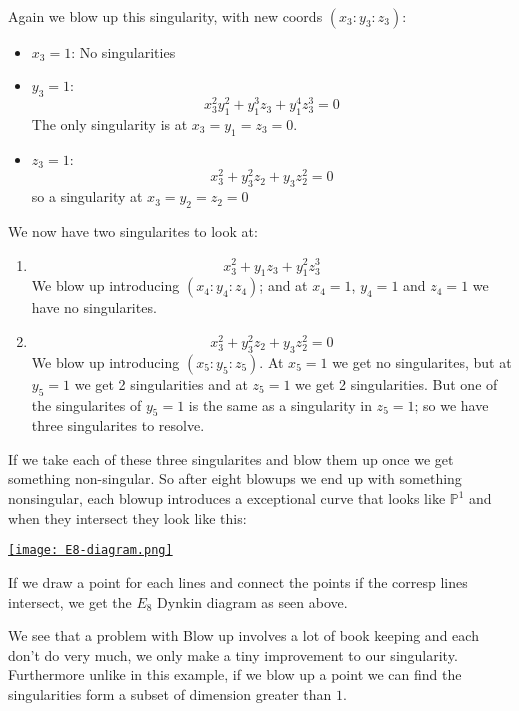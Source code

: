     \

    Again we blow up this singularity, with new coords $(x_3\colon y_3\colon z_3)$:\begin{itemize}
        \item $x_3=1$: No singularities
        \item $y_3=1$: \[x_3^2y_1^2+y_1^3z_3+y_1^4z_3^3 = 0\] The only singularity is at $x_3=y_1=z_3=0$.
        \item $z_3=1$: \[x_3^2+y_3^2z_2+y_3z_2^2 = 0\] so a singularity at $x_3=y_2=z_2=0$
    \end{itemize}
We now have two singularites to look at:\begin{enumerate}[label = (\arabic*)]
    \item \[x_3^2+y_1z_3+y_1^2z_3^3\] We blow up introducing $(x_4\colon y_4\colon z_4)$; and at $x_4 =1$, $y_4=1$ and $z_4=1$ we have no singularites.
    \item \[x_3^2+y_3^2z_2+y_3z_2^2 = 0\]We blow up introducing $(x_5\colon y_5\colon z_5)$. At $x_5=1$ we get no singularites, but at $y_5=1$ we get 2 singularities and at $z_5 = 1$ we get 2 singularities. But one of the singularites of $y_5=1$ is the same as a singularity in $z_5=1$; so we have three singularites to resolve.
\end{enumerate}

If we take each of these three singularites and blow them up once we get something non-singular. So after eight blowups we end up with something nonsingular, each blowup introduces a exceptional curve that looks like $\mathbb{P}^1$ and when they intersect they look like this:

\href{https://youtu.be/s2LYtd_UPY8?t=1102}{\texttt{[image: E8-diagram.png]}}

If we draw a point for each lines and connect the points if the corresp lines intersect, we get the $E_8$ Dynkin diagram as seen above. 

We see that a problem with Blow up involves a lot of book keeping and each don't do very much, we only make a tiny improvement to our singularity. Furthermore unlike in this example, if we blow up a point we can find the singularities form a subset of dimension greater than $1$.

